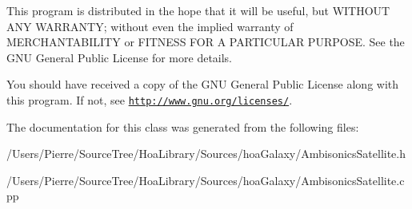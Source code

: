 This program is distributed in the hope that it will be useful, but W\-I\-T\-H\-O\-U\-T A\-N\-Y W\-A\-R\-R\-A\-N\-T\-Y; without even the implied warranty of M\-E\-R\-C\-H\-A\-N\-T\-A\-B\-I\-L\-I\-T\-Y or F\-I\-T\-N\-E\-S\-S F\-O\-R A P\-A\-R\-T\-I\-C\-U\-L\-A\-R P\-U\-R\-P\-O\-S\-E. See the G\-N\-U General Public License for more details.

You should have received a copy of the G\-N\-U General Public License along with this program. If not, see \href{http://www.gnu.org/licenses/}{\tt http\-://www.\-gnu.\-org/licenses/}. 

The documentation for this class was generated from the following files\-:\begin{DoxyCompactItemize}
\item 
/\-Users/\-Pierre/\-Source\-Tree/\-Hoa\-Library/\-Sources/hoa\-Galaxy/Ambisonics\-Satellite.\-h\item 
/\-Users/\-Pierre/\-Source\-Tree/\-Hoa\-Library/\-Sources/hoa\-Galaxy/Ambisonics\-Satellite.\-cpp\end{DoxyCompactItemize}
